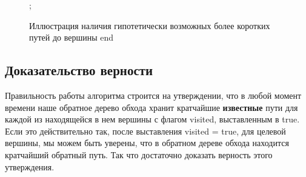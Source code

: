 \documentclass[../../article.tex]{subfiles}
\begin{document}
\begin{figure}
\begin{styledtikz}

        ;
    \end{styledtikz}
    \caption{Иллюстрация наличия гипотетически возможных более коротких путей до вершины {\firacodebold end}}
    \label{fig:dijkstraProve}
\end{figure}

\subsection{Доказательство верности} \label{dijkstraProve}

Правильность работы алгоритма строится на утверждении, что в любой момент времени наше обратное дерево обхода хранит кратчайшие {\bfseries известные} пути для каждой из находящейся в нем вершины с флагом {\firacodebold visited}, выставленным в {\firacodebold true}. Если это действительно так, после выставления {\firacodebold visited = true}, для целевой вершины, мы можем быть уверены, что в обратном дереве обхода находится кратчайший обратный путь. Так что достаточно доказать верность этого утверждения.
\end{document}
